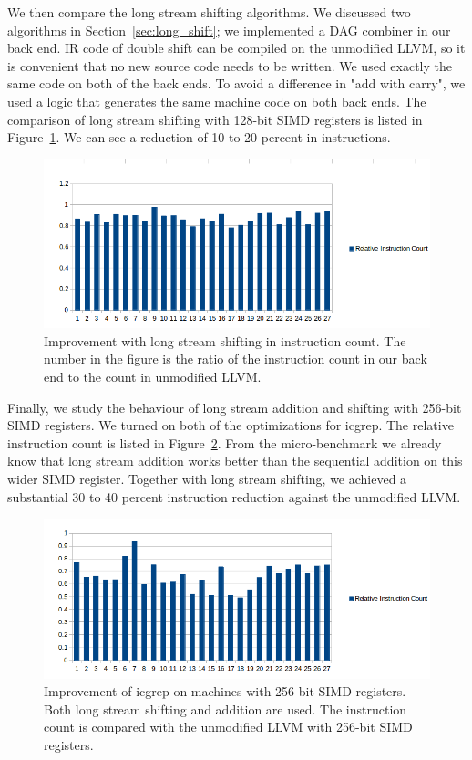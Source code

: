We then compare the long stream shifting algorithms. We discussed two algorithms in Section~\ref{sec:long_shift}; we implemented a DAG combiner in our back end. IR code of double shift can be compiled on the unmodified LLVM, so it is convenient that no new source code needs to be written. We used exactly the same code on both of the back ends. To avoid a difference in "add with carry", we used a logic that generates the same machine code on both back ends. The comparison of long stream shifting with 128-bit SIMD registers is listed in Figure~\ref{fig:inst_count_long_shift}. We can see a reduction of 10 to 20 percent in instructions.

\begin{figure}[htbp!]
\centering
\includegraphics[width=140mm]{draw/inst_count_long_shift.png}
\caption[Improvement with long stream shifting in instruction count]{Improvement with long stream shifting in instruction count. The number in the figure is the ratio of the instruction count in our back end to the count in unmodified LLVM.}
\label{fig:inst_count_long_shift}
\end{figure}

Finally, we study the behaviour of long stream addition and shifting with 256-bit SIMD registers. We turned on both of the optimizations for icgrep. The relative instruction count is listed in Figure~\ref{fig:inst_count_all_256}. From the micro-benchmark we already know that long stream addition works better than the sequential addition on this wider SIMD register. Together with long stream shifting, we achieved a substantial 30 to 40 percent instruction reduction against the unmodified LLVM.

\begin{figure}[htbp!]
\centering
\includegraphics[width=140mm]{draw/inst_count_all_256.png}
\caption[Improvement of icgrep on machines with 256-bit SIMD registers]{Improvement of icgrep on machines with 256-bit SIMD registers. Both long stream shifting and addition are used. The instruction count is compared with the unmodified LLVM with 256-bit SIMD registers.}
\label{fig:inst_count_all_256}
\end{figure}
